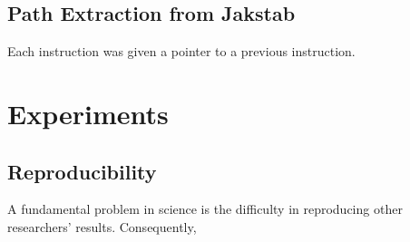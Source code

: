 \documentclass{kththesis}
\begin{document}








\subsection{Path Extraction from Jakstab}
Each instruction was given a pointer to a previous instruction.

\section{Experiments}
\subsection{Reproducibility}
A fundamental problem in science is the difficulty in reproducing other researchers' results. Consequently, 

\end{document}

